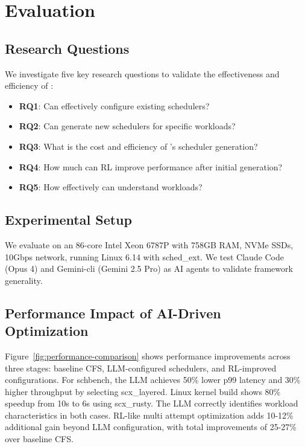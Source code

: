 \section{Evaluation}
\label{sec:evaluation}

\subsection{Research Questions}

We investigate five key research questions to validate the effectiveness and efficiency of \sys:

\begin{itemize}
\item \textbf{RQ1}: Can \sys effectively configure existing schedulers?
\item \textbf{RQ2}: Can \sys generate new schedulers for specific workloads?
\item \textbf{RQ3}: What is the cost and efficiency of \sys's scheduler generation?
\item \textbf{RQ4}: How much can RL improve performance after initial generation?
\item \textbf{RQ5}: How effectively can \sys understand workloads?
\end{itemize}

\subsection{Experimental Setup}

We evaluate \sys on an 86-core Intel Xeon 6787P with 758GB RAM, NVMe SSDs, 10Gbps network, running Linux 6.14 with sched\_ext. We test Claude Code (Opus 4) and Gemini-cli (Gemini 2.5 Pro) as AI agents to validate framework generality.

\subsection{Performance Impact of AI-Driven Optimization}

Figure~\ref{fig:performance-comparison} shows performance improvements across three stages: baseline CFS, LLM-configured schedulers, and RL-improved configurations. For schbench, the LLM achieves 50\% lower p99 latency and 30\% higher throughput by selecting scx\_layered. Linux kernel build shows 80\% speedup from 10s to 6s using scx\_rusty. The LLM correctly identifies workload characteristics in both cases. RL-like multi attempt optimization adds 10-12\% additional gain beyond LLM configuration, with total improvements of 25-27\% over baseline CFS.

